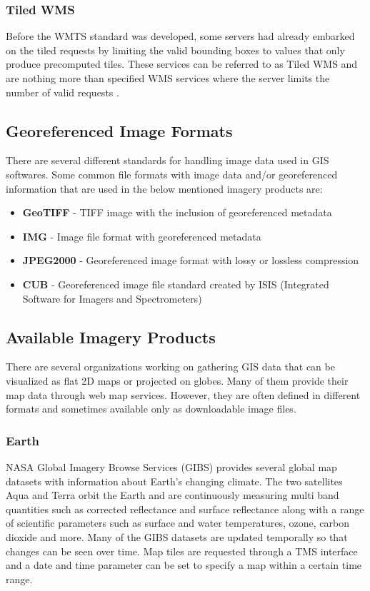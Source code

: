 \subsubsection{Tiled WMS}

Before the WMTS standard was developed, some servers had already embarked on the tiled requests by limiting the valid bounding boxes to values that only produce precomputed tiles. These services can be referred to as Tiled WMS and are nothing more than specified WMS services where the server limits the number of valid requests \cite{wmts10}.

\subsection{Georeferenced Image Formats}

There are several different standards for handling image data used in GIS softwares. Some common file formats with image data and/or georeferenced information that are used in the below mentioned imagery products are:

\begin{itemize}  
\item \textbf{GeoTIFF} - TIFF image with the inclusion of georeferenced metadata
\item \textbf{IMG} - Image file format with georeferenced metadata
\item \textbf{JPEG2000} - Georeferenced image format with lossy or lossless compression
\item \textbf{CUB} - Georeferenced image file standard created by ISIS (Integrated Software for Imagers and Spectrometers)
\end{itemize}

\subsection{Available Imagery Products}

There are several organizations working on gathering GIS data that can be visualized as flat 2D maps or projected on globes. Many of them provide their map data through web map services. However, they are often defined in different formats and sometimes available only as downloadable image files.

\subsubsection{Earth}

NASA Global Imagery Browse Services (GIBS) provides several global map datasets with information about Earth's changing climate. The two satellites Aqua and Terra orbit the Earth and are continuously measuring multi band quantities such as corrected reflectance and surface reflectance along with a range of scientific parameters such as surface and water temperatures, ozone, carbon dioxide and more. Many of the GIBS datasets are updated temporally so that changes can be seen over time. Map tiles are requested through a TMS interface and a date and time parameter can be set to specify a map within a certain time range.

